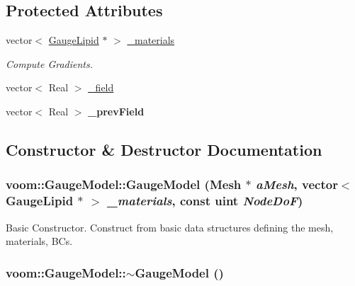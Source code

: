 \subsection*{Protected Attributes}
\begin{DoxyCompactItemize}
\item 
vector$<$ \hyperlink{classvoom_1_1_gauge_lipid}{GaugeLipid} $\ast$ $>$ \hyperlink{classvoom_1_1_gauge_model_a68fb6771675d320ae7e850b09fb487e4}{\_\-materials}
\begin{DoxyCompactList}\small\item\em Compute Gradients. \item\end{DoxyCompactList}\item 
vector$<$ Real $>$ \hyperlink{classvoom_1_1_gauge_model_a1d12d980a564a66d76235b3bc8e3eb5c}{\_\-field}
\item 
\hypertarget{classvoom_1_1_gauge_model_af33a0ce01ac695807ad60cd15a682b9f}{
vector$<$ Real $>$ {\bfseries \_\-prevField}}
\label{classvoom_1_1_gauge_model_af33a0ce01ac695807ad60cd15a682b9f}

\end{DoxyCompactItemize}


\subsection{Constructor \& Destructor Documentation}
\hypertarget{classvoom_1_1_gauge_model_a3396f08fc7d07e6a0bec056a30cc955d}{
\subsubsection[{GaugeModel}]{\setlength{\rightskip}{0pt plus 5cm}voom::GaugeModel::GaugeModel ({\bf Mesh} $\ast$ {\em aMesh}, \/  vector$<$ {\bf GaugeLipid} $\ast$ $>$ {\em \_\-materials}, \/  const uint {\em NodeDoF})}}
\label{classvoom_1_1_gauge_model_a3396f08fc7d07e6a0bec056a30cc955d}


Basic Constructor. Construct from basic data structures defining the mesh, materials, BCs. \hypertarget{classvoom_1_1_gauge_model_ad12784e32ca359d0e12d472c7c4513ee}{
\subsubsection[{$\sim$GaugeModel}]{\setlength{\rightskip}{0pt plus 5cm}voom::GaugeModel::$\sim$GaugeModel ()}}
\label{classvoom_1_1_gauge_model_ad12784e32ca359d0e12d472c7c4513ee}


